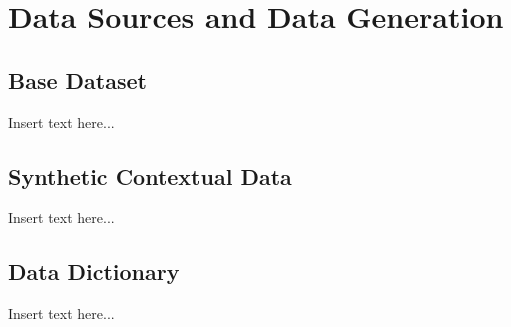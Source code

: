 \section{Data Sources and Data Generation}
\subsection{Base Dataset}
Insert text here...

\subsection{Synthetic Contextual Data}
Insert text here...

\subsection{Data Dictionary}
Insert text here...
